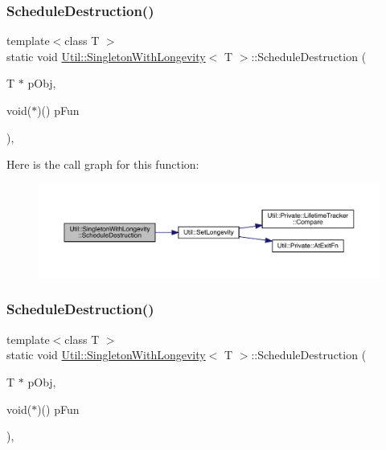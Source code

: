 \subsubsection{\texorpdfstring{ScheduleDestruction()}{ScheduleDestruction()}\hspace{0.1cm}{\footnotesize\ttfamily [2/3]}}
{\footnotesize\ttfamily template$<$class T $>$ \\
static void \mbox{\hyperlink{classUtil_1_1SingletonWithLongevity}{Util\+::\+Singleton\+With\+Longevity}}$<$ T $>$\+::Schedule\+Destruction (\begin{DoxyParamCaption}\item[{T $\ast$}]{p\+Obj,  }\item[{void($\ast$)()}]{p\+Fun }\end{DoxyParamCaption})\hspace{0.3cm}{\ttfamily [inline]}, {\ttfamily [static]}}

Here is the call graph for this function\+:
\nopagebreak
\begin{figure}[H]
\begin{center}
\leavevmode
\includegraphics[width=350pt]{d0/de9/classUtil_1_1SingletonWithLongevity_acada28acaf9030754388818a79b0468d_cgraph}
\end{center}
\end{figure}
\mbox{\label{classUtil_1_1SingletonWithLongevity_acada28acaf9030754388818a79b0468d}} 
\subsubsection{\texorpdfstring{ScheduleDestruction()}{ScheduleDestruction()}\hspace{0.1cm}{\footnotesize\ttfamily [3/3]}}
{\footnotesize\ttfamily template$<$class T $>$ \\
static void \mbox{\hyperlink{classUtil_1_1SingletonWithLongevity}{Util\+::\+Singleton\+With\+Longevity}}$<$ T $>$\+::Schedule\+Destruction (\begin{DoxyParamCaption}\item[{T $\ast$}]{p\+Obj,  }\item[{void($\ast$)()}]{p\+Fun }\end{DoxyParamCaption})\hspace{0.3cm}{\ttfamily [inline]}, {\ttfamily [static]}}

